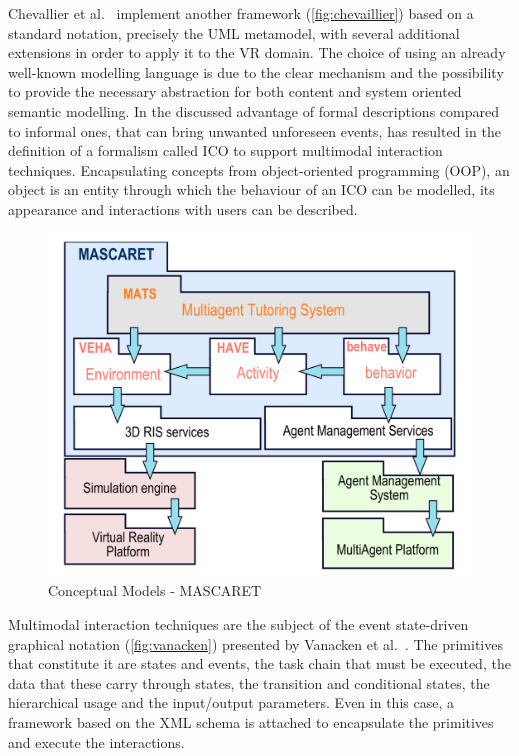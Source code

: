 Chevallier et al.~\cite{chevaillier_semantic_2012} implement another framework (\autoref{fig:chevaillier}) based on a standard notation, precisely the UML metamodel, with several additional extensions in order to apply it to the VR domain. The choice of using an already well-known modelling language is due to the clear mechanism and the possibility to provide the necessary abstraction for both content and system oriented semantic modelling. In \cite{costabile_formal_2005} the discussed advantage of formal descriptions compared to informal ones, that can bring unwanted unforeseen events, has resulted in the definition of a formalism called ICO to support multimodal interaction techniques. Encapsulating concepts from object-oriented programming (OOP), an object is an entity through which the behaviour of an ICO can be modelled, its appearance and interactions with users can be described.

\begin{figure}[htbp]
    \centering
    \includegraphics[width=12cm]{Figures/Background/models/chevallier.png}
    \caption{Conceptual Models - MASCARET}
    \label{fig:chevaillier}
\end{figure}

Multimodal interaction techniques are the subject of the event state-driven graphical notation (\autoref{fig:vanacken}) presented by Vanacken et al.~\cite{vanacken2006nimmit}. The primitives that constitute it are states and events, the task chain that must be executed, the data that these carry through states, the transition and conditional states, the hierarchical usage and the input/output parameters.  Even in this case, a framework based on the XML schema is attached to encapsulate the primitives and execute the interactions.

